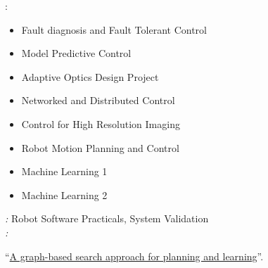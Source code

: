 \begin{rSection}{}
  \begin{experienceItem}
    {}{}{:}{}
  \end{experienceItem}
  \vspace{-0.1cm}
  \begin{center}
  \begin{minipage}{0.45\textwidth}
  \begin{itemize}
    \item Fault diagnosis and Fault Tolerant Control\\[-3ex]
    \item Model Predictive Control\\[-3ex]
    \item Adaptive Optics Design Project\\[-3ex]
    \item Networked and Distributed Control
  \end{itemize}
  \end{minipage}
  \begin{minipage}{0.45\textwidth}
  \begin{itemize}
    \item Control for High Resolution Imaging\\[-3ex]
    \item Robot Motion Planning and Control\\[-3ex]
    \item Machine Learning 1\\[-3ex]
    \item Machine Learning 2
  \end{itemize}
  \end{minipage}
\end{center}\vspace{0.3cm}

\textit{:}\hspace{0.2cm} Robot Software Practicals, System Validation\\

\textit{:} 
\begin{center}``\href{https://repository.tudelft.nl/islandora/object/uuid\%3Af988aaf6-c2a7-4782-b5de-8ca6187d03ef?collection=education}{\Large A graph-based search approach for planning and learning}''. 
\end{center}

\end{rSection}
\newpage

